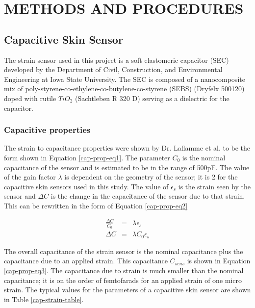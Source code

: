 \chapter{METHODS AND PROCEDURES}

\section{Capacitive Skin Sensor}
The strain sensor used in this project is a soft elastomeric capacitor (SEC) developed by the Department of Civil, Construction, and Environmental Engineering at Iowa State University.  The SEC is composed of a nanocomposite mix of poly-styrene-co-ethylene-co-butylene-co-styrene (SEBS) (Dryfelx 500120) doped with rutile $TiO_2$ (Sachtleben R 320 D) serving as a dielectric for the capacitor\cite{soft-elastomeric-capacitor}.

\subsection{Capacitive properties}
The strain to capacitance properties were shown by Dr. Laflamme et al. to be the form shown in Equation \ref{cap-prop-eq1}.  The parameter $C_0$ is the nominal capacitance of the sensor and is estimated to be in the range of 500pF.  The value of the gain factor $\lambda$ is dependent on the geometry of the sensor; it is 2 for the capacitive skin sensors used in this study.  The value of $\epsilon_s$ is the strain seen by the sensor and $\Delta C$ is the change in the capacitance of the sensor due to that strain.  This can be rewritten in the form of Equation \ref{cap-prop-eq2}

\begin{eqnarray}
	\frac{\Delta C}{C_0}&=&\lambda \epsilon_s\label{cap-prop-eq1}\\
	\Delta C &=& \lambda C_0 \epsilon_s\label{cap-prop-eq2}
\end{eqnarray}

The overall capacitance of the strain sensor is the nominal capacitance plus the capacitance due to an applied strain.  This capacitance $C_{sens}$ is shown in Equation \ref{cap-prop-eq3}.  The capacitance due to strain is much smaller than the nominal capacitance; it is on the order of femtofarads for an applied strain of one micro strain.  The typical values for the parameters of a capacitive skin sensor are shown in Table \ref{cap-strain-table}.


